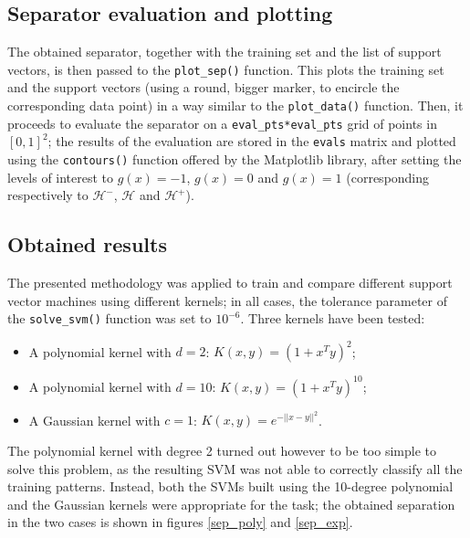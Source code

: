 \documentclass[letterpaper,headings=standardclasses]{scrartcl}
\begin{document}
\subsection{Separator evaluation and plotting}

The obtained separator, together with the training set and the list of support vectors, is then passed to the \texttt{plot\_sep()} function. This plots the training set and the support vectors (using a round, bigger marker, to encircle the corresponding data point) in a way similar to the \texttt{plot\_data()} function. Then, it proceeds to evaluate the separator on a \texttt{eval\_pts*eval\_pts} grid of points in $[0,1]^2$; the results of the evaluation are stored in the \texttt{evals} matrix and plotted using the \texttt{contours()} function offered by the Matplotlib library, after setting the levels of interest to $g(x) = -1$, $g(x) = 0$ and $g(x) = 1$ (corresponding respectively to $\mathcal{H}^-$, $\mathcal{H}$ and $\mathcal{H}^+$).

\subsection{Obtained results}

The presented methodology was applied to train and compare different support vector machines using different kernels; in all cases, the tolerance parameter of the \texttt{solve\_svm()} function was set to $10^{-6}$. Three kernels have been tested:

\begin{itemize}
    \item A polynomial kernel with $d = 2$: $K(x, y) = (1 + x^T y)^2$;
    \item A polynomial kernel with $d = 10$: $K(x, y) = (1 + x^T y)^{10}$;
    \item A Gaussian kernel with $c = 1$: $K(x, y) = e^{-||x - y||^2}$.
\end{itemize}

The polynomial kernel with degree 2 turned out however to be too simple to solve this problem, as the resulting SVM was not able to correctly classify all the training patterns. Instead, both the SVMs built using the 10-degree polynomial and the Gaussian kernels were appropriate for the task; the obtained separation in the two cases is shown in figures \ref{sep_poly} and \ref{sep_exp}.
\end{document}
